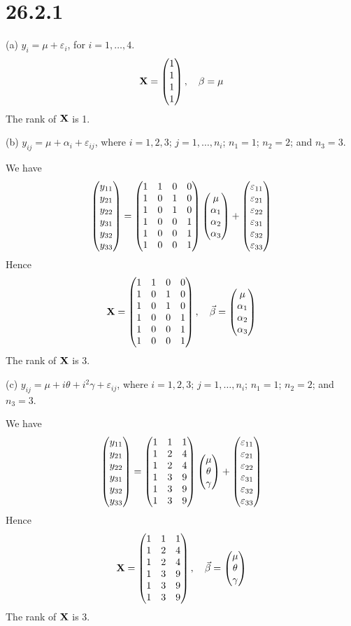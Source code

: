 \section*{26.2.1}
(a) $y_i=\mu+\varepsilon_i$, for $i=1,\ldots,4$.
$${\bf X}=\left(\begin{matrix}1\cr1\cr1\cr1\end{matrix}\right),\quad
{\beta}=\mu$$
The rank of $\bf X$ is 1.

\bigskip
\noindent
(b) $y_{ij}=\mu+\alpha_i+\varepsilon_{ij}$,
where $i=1,2,3$; $j=1,\ldots,n_i$; $n_1=1$; $n_2=2$; and $n_3=3$.

\bigskip
\noindent
We have
$$\left(\begin{matrix}
y_{11}\cr y_{21}\cr y_{22}\cr y_{31}\cr y_{32}\cr y_{33}
\end{matrix}\right)=
\left(\begin{matrix}
1 & 1 & 0 & 0\cr
1 & 0 & 1 & 0\cr
1 & 0 & 1 & 0\cr
1 & 0 & 0 & 1\cr
1 & 0 & 0 & 1\cr
1 & 0 & 0 & 1
\end{matrix}\right)
\left(\begin{matrix}
\mu\cr\alpha_1\cr\alpha_2\cr\alpha_3
\end{matrix}\right)
+\left(\begin{matrix}
\varepsilon_{11}\cr
\varepsilon_{21}\cr
\varepsilon_{22}\cr
\varepsilon_{31}\cr
\varepsilon_{32}\cr
\varepsilon_{33}
\end{matrix}\right)
$$
Hence
$${\bf X}=\left(\begin{matrix}
1 & 1 & 0 & 0\cr
1 & 0 & 1 & 0\cr
1 & 0 & 1 & 0\cr
1 & 0 & 0 & 1\cr
1 & 0 & 0 & 1\cr
1 & 0 & 0 & 1
\end{matrix}\right),\quad
{\vec\beta}=\left(\begin{matrix}
\mu\cr\alpha_1\cr\alpha_2\cr\alpha_3
\end{matrix}\right)
$$
The rank of $\bf X$ is 3.

\bigskip
\noindent
(c) $y_{ij}=\mu+i\theta+i^2\gamma+\varepsilon_{ij}$,
where $i=1,2,3$; $j=1,\ldots,n_i$; $n_1=1$; $n_2=2$; and $n_3=3$.

\bigskip
\noindent
We have
$$\left(\begin{matrix}
y_{11}\cr y_{21}\cr y_{22}\cr y_{31}\cr y_{32}\cr y_{33}
\end{matrix}\right)=
\left(\begin{matrix}
1 & 1 & 1\cr
1 & 2 & 4\cr
1 & 2 & 4\cr
1 & 3 & 9\cr
1 & 3 & 9\cr
1 & 3 & 9
\end{matrix}\right)
\left(\begin{matrix}
\mu\cr\theta\cr\gamma
\end{matrix}\right)
+\left(\begin{matrix}
\varepsilon_{11}\cr
\varepsilon_{21}\cr
\varepsilon_{22}\cr
\varepsilon_{31}\cr
\varepsilon_{32}\cr
\varepsilon_{33}
\end{matrix}\right)
$$
Hence
$${\bf X}=\left(\begin{matrix}
1 & 1 & 1\cr
1 & 2 & 4\cr
1 & 2 & 4\cr
1 & 3 & 9\cr
1 & 3 & 9\cr
1 & 3 & 9
\end{matrix}\right),\quad
{\vec\beta}=\left(\begin{matrix}
\mu\cr\theta\cr\gamma
\end{matrix}\right)
$$
The rank of $\bf X$ is 3.
